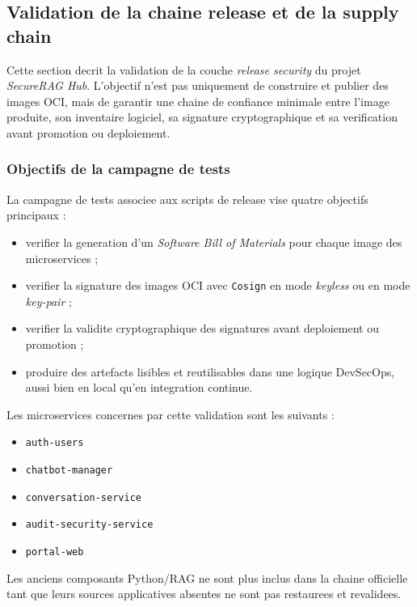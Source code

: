 \subsection{Validation de la chaine release et de la supply chain}
\label{sec:release-supply-chain-validation}

Cette section decrit la validation de la couche \textit{release security} du projet \textit{SecureRAG Hub}. L'objectif n'est pas uniquement de construire et publier des images OCI, mais de garantir une chaine de confiance minimale entre l'image produite, son inventaire logiciel, sa signature cryptographique et sa verification avant promotion ou deploiement.

\subsubsection{Objectifs de la campagne de tests}

La campagne de tests associee aux scripts de release vise quatre objectifs principaux :

\begin{itemize}
  \item verifier la generation d'un \textit{Software Bill of Materials} pour chaque image des microservices ;
  \item verifier la signature des images OCI avec \texttt{Cosign} en mode \textit{keyless} ou en mode \textit{key-pair} ;
  \item verifier la validite cryptographique des signatures avant deploiement ou promotion ;
  \item produire des artefacts lisibles et reutilisables dans une logique DevSecOps, aussi bien en local qu'en integration continue.
\end{itemize}

Les microservices concernes par cette validation sont les suivants :

\begin{itemize}
  \item \texttt{auth-users}
  \item \texttt{chatbot-manager}
  \item \texttt{conversation-service}
  \item \texttt{audit-security-service}
  \item \texttt{portal-web}
\end{itemize}

Les anciens composants Python/RAG ne sont plus inclus dans la chaine officielle tant que leurs sources applicatives absentes ne sont pas restaurees et revalidees.

